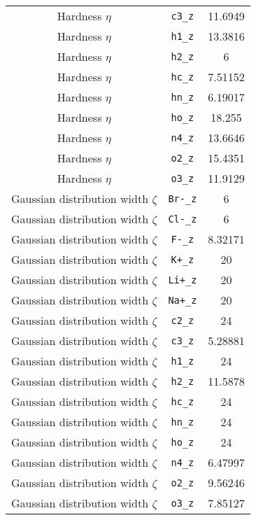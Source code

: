 \begin{table}[ht]
\begin{tabular}{|c|c|c|}
Hardness $\eta$ & \verb^c3_z^ & 11.6949 \\ 
Hardness $\eta$ & \verb^h1_z^ & 13.3816 \\ 
Hardness $\eta$ & \verb^h2_z^ & 6 \\ 
Hardness $\eta$ & \verb^hc_z^ & 7.51152 \\ 
Hardness $\eta$ & \verb^hn_z^ & 6.19017 \\ 
Hardness $\eta$ & \verb^ho_z^ & 18.255 \\ 
Hardness $\eta$ & \verb^n4_z^ & 13.6646 \\ 
Hardness $\eta$ & \verb^o2_z^ & 15.4351 \\ 
Hardness $\eta$ & \verb^o3_z^ & 11.9129 \\ 
Gaussian distribution width $\zeta$ & \verb^Br-_z^ & 6 \\ 
Gaussian distribution width $\zeta$ & \verb^Cl-_z^ & 6 \\ 
Gaussian distribution width $\zeta$ & \verb^F-_z^ & 8.32171 \\ 
Gaussian distribution width $\zeta$ & \verb^K+_z^ & 20 \\ 
Gaussian distribution width $\zeta$ & \verb^Li+_z^ & 20 \\ 
Gaussian distribution width $\zeta$ & \verb^Na+_z^ & 20 \\ 
Gaussian distribution width $\zeta$ & \verb^c2_z^ & 24 \\ 
Gaussian distribution width $\zeta$ & \verb^c3_z^ & 5.28881 \\ 
Gaussian distribution width $\zeta$ & \verb^h1_z^ & 24 \\ 
Gaussian distribution width $\zeta$ & \verb^h2_z^ & 11.5878 \\ 
Gaussian distribution width $\zeta$ & \verb^hc_z^ & 24 \\ 
Gaussian distribution width $\zeta$ & \verb^hn_z^ & 24 \\ 
Gaussian distribution width $\zeta$ & \verb^ho_z^ & 24 \\ 
Gaussian distribution width $\zeta$ & \verb^n4_z^ & 6.47997 \\ 
Gaussian distribution width $\zeta$ & \verb^o2_z^ & 9.56246 \\ 
Gaussian distribution width $\zeta$ & \verb^o3_z^ & 7.85127 \\ 
\hline
\end{tabular}
\end{table}

